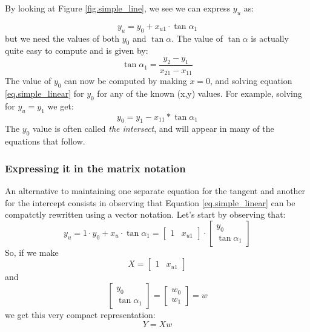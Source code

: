 By looking at Figure \ref{fig.simple_line}, we see we can express $y_u$ as:

\begin{equation}
y_u = y_0 + x_{u1} \cdot \tan\alpha_1
\label{eq.simple_linear}
\end{equation}
but we need the values of both $y_0$ and $\tan\alpha$. The value of $\tan\alpha$ is actually quite easy to compute and is given by:
\begin{equation}
\tan\alpha_1 = \frac{y_2 - y_1}{x_{21} - x_{11}}
\label{eq.simple_tangent}
\end{equation}
The value of $y_0$ can now be computed by making $x = 0$, and solving equation \ref{eq.simple_linear} for $y_0$ for any of the known (x,y) values. For example, solving for $y_u = y_1$ we get:
\begin{equation}
y_0 = y_1 - x_{11} * \tan\alpha_1
\end{equation}
The $y_0$ value is often called \emph{the intersect}, and will appear in many of the equations that follow.

\subsubsection{Expressing it in the matrix notation}
An alternative to maintaining one separate equation for the tangent and another for the intercept consists in observing that Equation \ref{eq.simple_linear} can be compatctly rewritten using a vector notation. Let's start by observing that:
\begin{equation}
y_u =  
1 \cdot y_0 + x_u \cdot \tan\alpha_1
=
\begin{bmatrix}
1 &
x_{u1}
\end{bmatrix}
\cdot
\begin{bmatrix}
y_0 \\ 
\tan\alpha_1
\end{bmatrix} 
\end{equation}
So, if we make 
\begin{equation}
X = 
\begin{bmatrix}
1 & x_{u1}
\end{bmatrix}
\end{equation}
and
\begin{equation}
\begin{bmatrix}
y_0 \\
\tan\alpha_1
\end{bmatrix}
=
\begin{bmatrix}
w_0 \\
w_1
\end{bmatrix}
= w
\end{equation}
we get this very compact representation:
\begin{equation}
Y = X w
\end{equation}

